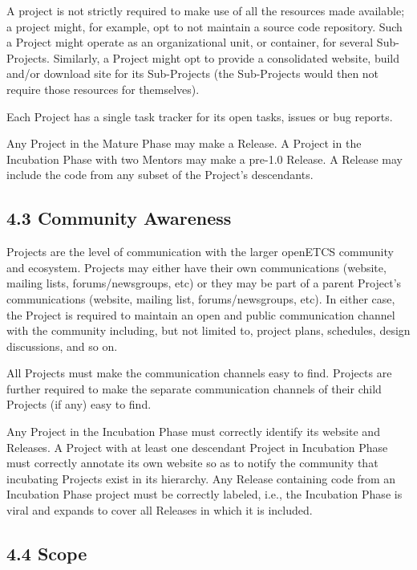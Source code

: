 A project is not strictly required to make use of all the resources made
available; a project might, for example, opt to not maintain a source
code repository. Such a Project might operate as an organizational unit,
or container, for several Sub-Projects. Similarly, a Project might opt
to provide a consolidated website, build and/or download site for its
Sub-Projects (the Sub-Projects would then not require those resources
for themselves).

Each Project has a single task tracker for its open tasks, issues or bug
reports.

Any Project in the Mature Phase may make a Release. A Project in the
Incubation Phase with two Mentors may make a pre-1.0 Release. A Release
may include the code from any subset of the Project's descendants.

\subsection{4.3 Community Awareness}\label{community-awareness}

Projects are the level of communication with the larger openETCS
community and ecosystem. Projects may either have their own
communications (website, mailing lists, forums/newsgroups, etc) or they
may be part of a parent Project's communications (website, mailing list,
forums/newsgroups, etc). In either case, the Project is required to
maintain an open and public communication channel with the community
including, but not limited to, project plans, schedules, design
discussions, and so on.

All Projects must make the communication channels easy to find. Projects
are further required to make the separate communication channels of
their child Projects (if any) easy to find.

Any Project in the Incubation Phase must correctly identify its website
and Releases. A Project with at least one descendant Project in
Incubation Phase must correctly annotate its own website so as to notify
the community that incubating Projects exist in its hierarchy. Any
Release containing code from an Incubation Phase project must be
correctly labeled, i.e., the Incubation Phase is viral and expands to
cover all Releases in which it is included.

\subsection{4.4 Scope}\label{scope}

